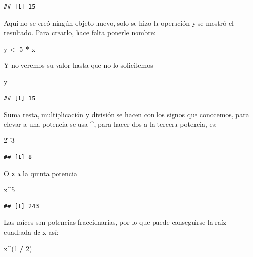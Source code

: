 \documentclass[]{book}
\newenvironment{Shaded}{\begin{snugshade}}{\end{snugshade}}
\newcommand{\DecValTok}[1]{\textcolor[rgb]{0.00,0.00,0.81}{#1}}
\newcommand{\NormalTok}[1]{#1}
\newcommand{\OperatorTok}[1]{\textcolor[rgb]{0.81,0.36,0.00}{\textbf{#1}}}
\newcommand{\StringTok}[1]{\textcolor[rgb]{0.31,0.60,0.02}{#1}}
\begin{document}
\begin{verbatim}
## [1] 15
\end{verbatim}

Aquí no se creó ningún objeto nuevo, solo se hizo la operación y se mostró el resultado. Para crearlo, hace falta ponerle nombre:

\begin{Shaded}
\begin{Highlighting}[]
\NormalTok{y <-}\StringTok{ }\DecValTok{5} \OperatorTok{*}\StringTok{ }\NormalTok{x}
\end{Highlighting}
\end{Shaded}

Y no veremos su valor hasta que no lo solicitemos

\begin{Shaded}
\begin{Highlighting}[]
\NormalTok{y}
\end{Highlighting}
\end{Shaded}

\begin{verbatim}
## [1] 15
\end{verbatim}

Suma resta, multiplicación y división se hacen con los signos que conocemos, para elevar a una potencia se usa \^{}, para hacer dos a la tercera potencia, es:

\begin{Shaded}
\begin{Highlighting}[]
\DecValTok{2}\OperatorTok{^}\DecValTok{3}
\end{Highlighting}
\end{Shaded}

\begin{verbatim}
## [1] 8
\end{verbatim}

O \texttt{x} a la quinta potencia:

\begin{Shaded}
\begin{Highlighting}[]
\NormalTok{x}\OperatorTok{^}\DecValTok{5}
\end{Highlighting}
\end{Shaded}

\begin{verbatim}
## [1] 243
\end{verbatim}

Las raíces son potencias fraccionarias, por lo que puede conseguirse la raíz cuadrada de x así:

\begin{Shaded}
\begin{Highlighting}[]
\NormalTok{x}\OperatorTok{^}\NormalTok{(}\DecValTok{1} \OperatorTok{/}\StringTok{ }\DecValTok{2}\NormalTok{)}
\end{Highlighting}
\end{Shaded}
\end{document}
